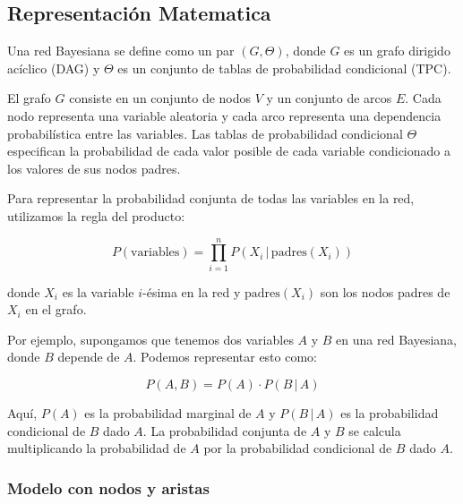 \subsection{Representación Matematica}

Una red Bayesiana se define como un par \( (G, \Theta) \), donde \( G \) es un grafo dirigido acíclico (DAG) y \( \Theta \) es un conjunto de tablas de probabilidad condicional (TPC). 

El grafo \( G \) consiste en un conjunto de nodos \( V \) y un conjunto de arcos \( E \). Cada nodo representa una variable aleatoria y cada arco representa una dependencia probabilística entre las variables. Las tablas de probabilidad condicional \( \Theta \) especifican la probabilidad de cada valor posible de cada variable condicionado a los valores de sus nodos padres.

Para representar la probabilidad conjunta de todas las variables en la red, utilizamos la regla del producto:

\[
P(\text{{variables}}) = \prod_{i=1}^{n} P(X_i \,|\, \text{{padres}}(X_i))
\]

donde \( X_i \) es la variable \( i \)-ésima en la red y \( \text{{padres}}(X_i) \) son los nodos padres de \( X_i \) en el grafo.

Por ejemplo, supongamos que tenemos dos variables \( A \) y \( B \) en una red Bayesiana, donde \( B \) depende de \( A \). Podemos representar esto como:

\[
P(A, B) = P(A) \cdot P(B \,|\, A)
\]

Aquí, \( P(A) \) es la probabilidad marginal de \( A \) y \( P(B \,|\, A) \) es la probabilidad condicional de \( B \) dado \( A \). La probabilidad conjunta de \( A \) y \( B \) se calcula multiplicando la probabilidad de \( A \) por la probabilidad condicional de \( B \) dado \( A \).\\ 

\subsubsection*{Modelo con nodos y aristas}


